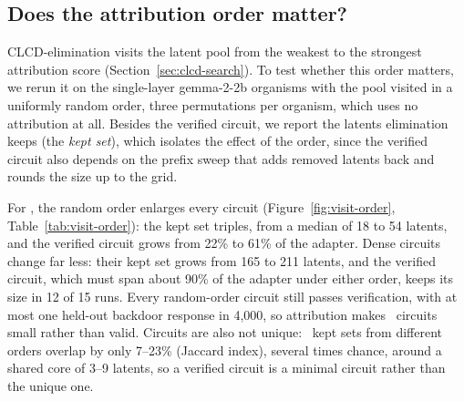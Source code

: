 \subsection{Does the attribution order matter?}
\label{app:visit-order}

CLCD-elimination visits the latent pool from the weakest to the strongest attribution score (Section~\ref{sec:clcd-search}). To test whether this order matters, we rerun it on the single-layer gemma-2-2b organisms with the pool visited in a uniformly random order, three permutations per organism, which uses no attribution at all. Besides the verified circuit, we report the latents elimination keeps (the \emph{kept set}), which isolates the effect of the order, since the verified circuit also depends on the prefix sweep that adds removed latents back and rounds the size up to the grid.

For \topklora, the random order enlarges every circuit (Figure~\ref{fig:visit-order}, Table~\ref{tab:visit-order}): the kept set triples, from a median of 18 to 54 latents, and the verified circuit grows from 22\% to 61\% of the adapter. Dense circuits change far less: their kept set grows from 165 to 211 latents, and the verified circuit, which must span about 90\% of the adapter under either order, keeps its size in 12 of 15 runs. Every random-order circuit still passes verification, with at most one held-out backdoor response in 4{,}000, so attribution makes \topklora\ circuits small rather than valid. Circuits are also not unique: \topklora\ kept sets from different orders overlap by only 7--23\% (Jaccard index), several times chance, around a shared core of 3--9 latents, so a verified circuit is a minimal circuit rather than the unique one.



